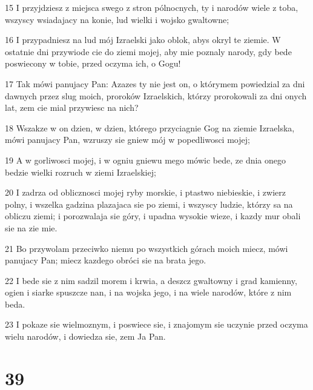 \par 15 I przyjdziesz z miejsca swego z stron pólnocnych, ty i narodów wiele z toba, wszyscy wsiadajacy na konie, lud wielki i wojsko gwaltowne;
\par 16 I przypadniesz na lud mój Izraelski jako oblok, abys okryl te ziemie. W ostatnie dni przywiode cie do ziemi mojej, aby mie poznaly narody, gdy bede poswiecony w tobie, przed oczyma ich, o Gogu!
\par 17 Tak mówi panujacy Pan: Azazes ty nie jest on, o którymem powiedzial za dni dawnych przez slug moich, proroków Izraelskich, którzy prorokowali za dni onych lat, zem cie mial przywiesc na nich?
\par 18 Wszakze w on dzien, w dzien, którego przyciagnie Gog na ziemie Izraelska, mówi panujacy Pan, wzruszy sie gniew mój w popedliwosci mojej;
\par 19 A w gorliwosci mojej, i w ogniu gniewu mego mówic bede, ze dnia onego bedzie wielki rozruch w ziemi Izraelskiej;
\par 20 I zadrza od oblicznosci mojej ryby morskie, i ptastwo niebieskie, i zwierz polny, i wszelka gadzina plazajaca sie po ziemi, i wszyscy ludzie, którzy sa na obliczu ziemi; i porozwalaja sie góry, i upadna wysokie wieze, i kazdy mur obali sie na zie mie.
\par 21 Bo przywolam przeciwko niemu po wszystkich górach moich miecz, mówi panujacy Pan; miecz kazdego obróci sie na brata jego.
\par 22 I bede sie z nim sadzil morem i krwia, a deszcz gwaltowny i grad kamienny, ogien i siarke spuszcze nan, i na wojska jego, i na wiele narodów, które z nim beda.
\par 23 I pokaze sie wielmoznym, i poswiece sie, i znajomym sie uczynie przed oczyma wielu narodów, i dowiedza sie, zem Ja Pan.

\chapter{39}

